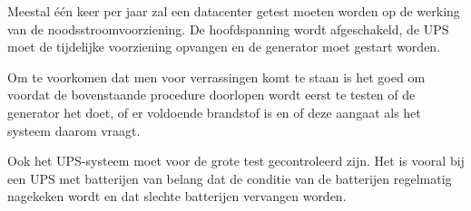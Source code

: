 Meestal \'e\'en keer per jaar zal een datacenter getest moeten worden op de werking van de noodsstroomvoorziening. De hoofdspanning wordt afgeschakeld, de UPS moet de tijdelijke voorziening opvangen en de generator moet gestart worden.

Om te voorkomen dat men voor verrassingen komt te staan is het goed om voordat de bovenstaande procedure doorlopen wordt eerst te testen of de generator het doet, of er voldoende brandstof is en of deze aangaat als het systeem daarom vraagt.

Ook het UPS-systeem moet voor de grote test gecontroleerd zijn. Het is vooral bij een UPS met batterijen van belang dat de conditie van de batterijen regelmatig nagekeken wordt en dat slechte batterijen vervangen worden.
